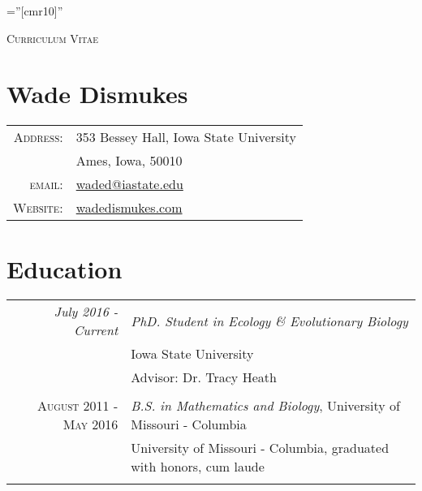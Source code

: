 \documentclass[12pt]{article}
\begin{document}

\pagestyle{empty} %

\font\fb=''[cmr10]'' %

\par{\centering
		{\Large \textsc{Curriculum Vitae}
	}\bigskip\par}

\section{\LARGE Wade Dismukes}

\begin{tabular}{rl}
    \textsc{Address:}   & 353 Bessey Hall, Iowa State University \\
                        & Ames, Iowa, 50010 \\
    \textsc{email:}     & \href{mailto:waded@iastate.edu}{waded@iastate.edu}\\
    \textsc{Website:}   & \href{https://www.wadedismukes.com/} {wadedismukes.com}
\end{tabular}

\section{Education}
\begin{tabular}{r|p{11cm}}
 \emph{July 2016 - Current} & \emph{PhD. Student in Ecology \& Evolutionary Biology} \\
 & Iowa State University \\
 & Advisor: Dr. Tracy Heath \\\multicolumn{2}{c}{} \\\textsc{August 2011 - May 2016} &\emph{B.S. in Mathematics and Biology}, University of Missouri - Columbia \\&\footnotesize{University of Missouri - Columbia, graduated with honors, cum laude}\\\multicolumn{2}{c}{} \\
\end{tabular}
\end{document}
